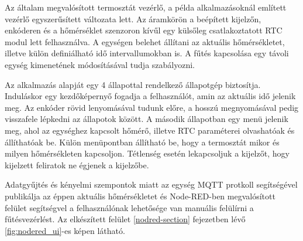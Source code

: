 Az általam megvalósított termosztát vezérlő, a példa alkalmazásoknál említett vezérlő egyszerűsített változata lett. Az áramkörön a beépített kijelzőn, enkóderen és a hőmérséklet szenzoron kívűl egy külsőleg csatlakoztatott RTC modul lett felhasználva. A egységen belehet állítani az aktuális hőmérsékletet, illetve külön definiálható idő intervallumokban is. A fűtés kapcsolása egy távoli egység kimenetének módosításával tudja szabályozni.

Az alkalmazás alapját egy 4 állapottal rendelkező állapotgép biztosítja. Induláskor egy kezdőképernyő fogadja a felhasználót, amin az aktuális idő jelenik meg. Az enkóder rövid lenyomásával tudunk előre, a hosszú megnyomásával pedig visszafele lépkedni az állapotok között. A második állapotban egy menü jelenik meg, ahol az egységhez kapcsolt hőmérő, illetve RTC paraméterei olvashatóak és állíthatóak be. Külön menüpontban állítható be, hogy a termosztát mikor és milyen hőmérsékleten kapcsoljon. Tétlenség esetén lekapcsoljuk a kijelzőt, hogy kijelzett feliratok ne égjenek a kijelzőbe.

Adatgyűjtés és kényelmi szempontok miatt az egység MQTT protkoll segítségével publikálja az éppen aktuális hőmérsékletet és Node-RED-ben megvalósított felület segítségvel a felhasználónak lehetősége van manuális felülírni a fűtésvezérlést. Az elkészített felület \ref{nodred-section} fejezetben lévő \ref{fig:nodered_ui}-es képen látható.